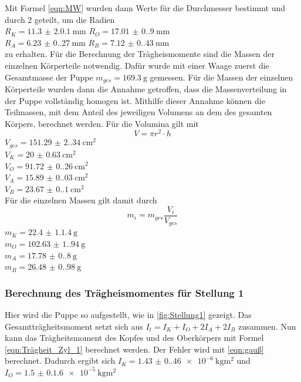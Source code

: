     Mit Formel \ref{eqn:MW} wurden dann Werte für die Durchmesser bestimmt und durch 2 geteilt, um die Radien\\
    $R_K=\qty{11.3(2.01)}{\milli\meter}$ \quad
    $R_O=\qty{17.01(0.90)}{\milli\meter}$\\
    $R_A=\qty{6.23(0.27)}{\milli\meter}$ \quad
    $R_B=\qty{7.12(0.43)}{\milli\meter}$\\
    zu erhalten.
    Für die Berechnung der Trägheismomente sind die Massen der einzelnen Körperteile notwendig.
    Dafür wurde mit einer Waage zuerst die Gesamtmasse der Puppe $m_{ges}=\qty{169.3}{\gram}$ gemessen.
    Für die Massen der einzelnen Körperteile wurden dann die Annahme getroffen, dass die Massenverteilung in der Puppe vollständig homogen ist.
    Mithilfe dieser Annahme können die Teilmassen, mit dem Anteil des jeweiligen Volumens an dem des gesamten Körpers, berechnet werden.
    Für die Volumina gilt mit 
    \begin{equation}
      V=\pi r^2 \cdot h
      \label{eqn:volumen}
    \end{equation}
    $V_{ges}=\qty{151.29(2.34)}{\centi\meter\squared}$\\
    $V_K=\qty{20(0.63)}{\centi\meter\squared}$    \\
    $V_O=\qty{91.72(0.26)}{\centi\meter\squared}$ \\
    $V_A=\qty{15.89(0.03)}{\centi\meter\squared}$ \\
    $V_B=\qty{23.67(0.1)}{\centi\meter\squared}$  \\

    Für die einzelnen Massen gilt damit durch 
    \begin{equation}
      m_i=m_{ges} \frac{V_i}{V_{ges}}
    \end{equation}
    $m_K=\qty{22.4(1.14)}{\gram}$\\
    $m_O=\qty{102.63(1.94)}{\gram}$\\
    $m_A=\qty{17.78(0.8)}{\gram}$\\
    $m_B=\qty{26.48(0.98)}{\gram}$\\

    \subsubsection{Berechnung des Trägheismomentes für Stellung 1}
    Hier wird die Puppe so aufgestellt, wie in \ref{fig:Stellung1} gezeigt.%
    Das Gesamtträgheitsmoment setzt sich aus $I_{t}=I_K+I_O+2I_A+2I_B$ zusammen.
    Nun kann das Trägheitsmoment des Kopfes und des Oberkörpers mit Formel \ref{eqn:Trägheit_Zyl_1} berechnet werden.
    Der Fehler wird mit \ref{eqn:gauß} berechnet.
    Dadurch ergibt sich $I_K=\qty{1.43(0.46)e-6}{\kilo\gram\meter\squared}$ und $I_O=\qty{1.5(0.16)e-5}{\kilo\gram\meter\squared}$\\
    
